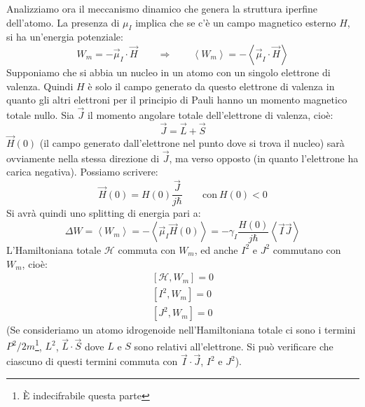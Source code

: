 Analizziamo ora il meccanismo dinamico che genera la struttura iperfine
dell'atomo. La presenza di $\mu_I$ implica che se c'è un campo magnetico 
esterno
$H$, si ha un'energia potenziale:
\begin{equation}
W_m = -\vec{\mu}_I \cdot \vec{H} \qquad \Rightarrow \qquad \left \langle W_m 
\right \rangle = -\left \langle \vec{\mu}_I \cdot \vec{H} \right \rangle
\end{equation}
Supponiamo che si abbia un nucleo in un atomo con un singolo elettrone di
valenza. Quindi $H$ è solo il campo generato da questo elettrone di valenza in
quanto gli altri elettroni per il principio di Pauli hanno un momento magnetico
totale nullo. Sia $\vec{J}$ il momento angolare totale dell'elettrone di
valenza, cioè:
\begin{equation}
\vec{J} = \vec{L} + \vec{S}
\end{equation}
 $\vec{H}{(0)}$ (il campo generato dall'elettrone nel punto dove si trova il
 nucleo) sarà ovviamente nella stessa direzione di $\vec{J}$, ma verso opposto
 (in quanto l'elettrone ha carica negativa). Possiamo scrivere:
\begin{equation}
\vec{H}{(0)} = H{(0)}\frac{\vec{J}}{j\hbar} \qquad \text{con}\ H{(0)}<0
\end{equation}
Si avrà quindi uno splitting di energia pari a:
\begin{equation}
\Delta W = \left \langle W_m \right \rangle = -\left \langle \vec{\mu}_I 
\vec{H}{(0)} \right \rangle = -\gamma_I \frac{H{(0)}}{j \hbar} \left \langle 
\vec{I} \vec{J} \right \rangle
\end{equation}
L'Hamiltoniana totale $\mathcal{H}$ commuta con $W_m$, ed anche $I^2$ e $J^2$
commutano con $W_m$, cioè:
\begin{equation}\begin{split}
\left [ \mathcal{H}, W_m \right ] = 0\\
\left [ I^2, W_m \right ] = 0\\
\left [ J^2, W_m \right ] = 0
\end{split}\end{equation}
(Se consideriamo un atomo idrogenoide nell'Hamiltoniana totale ci sono i termini
$P^{2}/2m$\footnote{È indecifrabile questa parte}, $L^2$, $\vec{L} \cdot 
\vec{S}$
dove $L$ e $S$ sono relativi all'elettrone. Si può verificare che ciascuno di
questi termini commuta con $\vec{I} \cdot \vec{J}$, $I^2$ e $J^2$).

